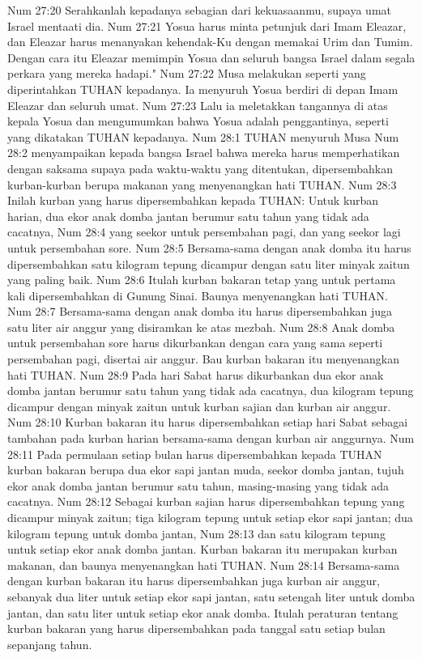 Num 27:20  Serahkanlah kepadanya sebagian dari kekuasaanmu, supaya umat Israel mentaati dia.
Num 27:21  Yosua harus minta petunjuk dari Imam Eleazar, dan Eleazar harus menanyakan kehendak-Ku dengan memakai Urim dan Tumim. Dengan cara itu Eleazar memimpin Yosua dan seluruh bangsa Israel dalam segala perkara yang mereka hadapi."
Num 27:22  Musa melakukan seperti yang diperintahkan TUHAN kepadanya. Ia menyuruh Yosua berdiri di depan Imam Eleazar dan seluruh umat.
Num 27:23  Lalu ia meletakkan tangannya di atas kepala Yosua dan mengumumkan bahwa Yosua adalah penggantinya, seperti yang dikatakan TUHAN kepadanya.
Num 28:1  TUHAN menyuruh Musa
Num 28:2  menyampaikan kepada bangsa Israel bahwa mereka harus memperhatikan dengan saksama supaya pada waktu-waktu yang ditentukan, dipersembahkan kurban-kurban berupa makanan yang menyenangkan hati TUHAN.
Num 28:3  Inilah kurban yang harus dipersembahkan kepada TUHAN: Untuk kurban harian, dua ekor anak domba jantan berumur satu tahun yang tidak ada cacatnya,
Num 28:4  yang seekor untuk persembahan pagi, dan yang seekor lagi untuk persembahan sore.
Num 28:5  Bersama-sama dengan anak domba itu harus dipersembahkan satu kilogram tepung dicampur dengan satu liter minyak zaitun yang paling baik.
Num 28:6  Itulah kurban bakaran tetap yang untuk pertama kali dipersembahkan di Gunung Sinai. Baunya menyenangkan hati TUHAN.
Num 28:7  Bersama-sama dengan anak domba itu harus dipersembahkan juga satu liter air anggur yang disiramkan ke atas mezbah.
Num 28:8  Anak domba untuk persembahan sore harus dikurbankan dengan cara yang sama seperti persembahan pagi, disertai air anggur. Bau kurban bakaran itu menyenangkan hati TUHAN.
Num 28:9  Pada hari Sabat harus dikurbankan dua ekor anak domba jantan berumur satu tahun yang tidak ada cacatnya, dua kilogram tepung dicampur dengan minyak zaitun untuk kurban sajian dan kurban air anggur.
Num 28:10  Kurban bakaran itu harus dipersembahkan setiap hari Sabat sebagai tambahan pada kurban harian bersama-sama dengan kurban air anggurnya.
Num 28:11  Pada permulaan setiap bulan harus dipersembahkan kepada TUHAN kurban bakaran berupa dua ekor sapi jantan muda, seekor domba jantan, tujuh ekor anak domba jantan berumur satu tahun, masing-masing yang tidak ada cacatnya.
Num 28:12  Sebagai kurban sajian harus dipersembahkan tepung yang dicampur minyak zaitun; tiga kilogram tepung untuk setiap ekor sapi jantan; dua kilogram tepung untuk domba jantan,
Num 28:13  dan satu kilogram tepung untuk setiap ekor anak domba jantan. Kurban bakaran itu merupakan kurban makanan, dan baunya menyenangkan hati TUHAN.
Num 28:14  Bersama-sama dengan kurban bakaran itu harus dipersembahkan juga kurban air anggur, sebanyak dua liter untuk setiap ekor sapi jantan, satu setengah liter untuk domba jantan, dan satu liter untuk setiap ekor anak domba. Itulah peraturan tentang kurban bakaran yang harus dipersembahkan pada tanggal satu setiap bulan sepanjang tahun.
